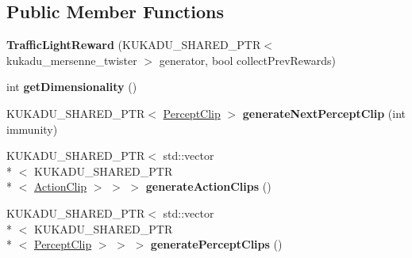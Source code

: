 \subsection*{Public Member Functions}
\begin{DoxyCompactItemize}
\item 
\hypertarget{classkukadu_1_1TrafficLightReward_aee29723172229537b228ba24b835b2ae}{{\bfseries Traffic\-Light\-Reward} (K\-U\-K\-A\-D\-U\-\_\-\-S\-H\-A\-R\-E\-D\-\_\-\-P\-T\-R$<$ kukadu\-\_\-mersenne\-\_\-twister $>$ generator, bool collect\-Prev\-Rewards)}\label{classkukadu_1_1TrafficLightReward_aee29723172229537b228ba24b835b2ae}

\item 
\hypertarget{classkukadu_1_1TrafficLightReward_a6403f87df8eeddeb8dda9c31f56d9323}{int {\bfseries get\-Dimensionality} ()}\label{classkukadu_1_1TrafficLightReward_a6403f87df8eeddeb8dda9c31f56d9323}

\item 
\hypertarget{classkukadu_1_1TrafficLightReward_a88bc051a138d64d8deed31c6691a1b73}{K\-U\-K\-A\-D\-U\-\_\-\-S\-H\-A\-R\-E\-D\-\_\-\-P\-T\-R$<$ \hyperlink{classkukadu_1_1PerceptClip}{Percept\-Clip} $>$ {\bfseries generate\-Next\-Percept\-Clip} (int immunity)}\label{classkukadu_1_1TrafficLightReward_a88bc051a138d64d8deed31c6691a1b73}

\item 
\hypertarget{classkukadu_1_1TrafficLightReward_a7765f321e0ccdfb18b4e3a77ab37eaf7}{K\-U\-K\-A\-D\-U\-\_\-\-S\-H\-A\-R\-E\-D\-\_\-\-P\-T\-R$<$ std\-::vector\\*
$<$ K\-U\-K\-A\-D\-U\-\_\-\-S\-H\-A\-R\-E\-D\-\_\-\-P\-T\-R\\*
$<$ \hyperlink{classkukadu_1_1ActionClip}{Action\-Clip} $>$ $>$ $>$ {\bfseries generate\-Action\-Clips} ()}\label{classkukadu_1_1TrafficLightReward_a7765f321e0ccdfb18b4e3a77ab37eaf7}

\item 
\hypertarget{classkukadu_1_1TrafficLightReward_a2bfc6915b70e451a7235f5d29a08f53a}{K\-U\-K\-A\-D\-U\-\_\-\-S\-H\-A\-R\-E\-D\-\_\-\-P\-T\-R$<$ std\-::vector\\*
$<$ K\-U\-K\-A\-D\-U\-\_\-\-S\-H\-A\-R\-E\-D\-\_\-\-P\-T\-R\\*
$<$ \hyperlink{classkukadu_1_1PerceptClip}{Percept\-Clip} $>$ $>$ $>$ {\bfseries generate\-Percept\-Clips} ()}\label{classkukadu_1_1TrafficLightReward_a2bfc6915b70e451a7235f5d29a08f53a}

\end{DoxyCompactItemize}
